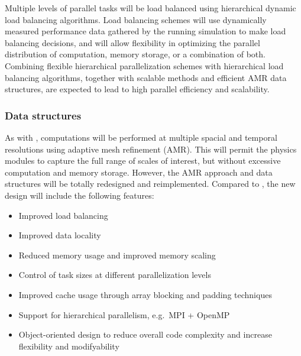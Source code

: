 \documentclass[11pt]{article}
\begin{document}

    Multiple levels of parallel tasks will be load balanced using
    hierarchical dynamic load balancing algorithms.  Load balancing
    schemes will use dynamically measured performance data gathered by
    the running simulation to make load balancing decisions, and will
    allow flexibility in optimizing the parallel distribution of
    computation, memory storage, or a combination of both.  Combining
    flexible hierarchical parallelization schemes with hierarchical
    load balancing algorithms, together with scalable methods and
    efficient AMR data structures, are expected to lead to high
    parallel efficiency and scalability.


    \subsubsection{Data structures}

    
    As with \enzo, computations will be performed at multiple spacial
    and temporal resolutions using adaptive mesh refinement (AMR).
    This will permit the physics modules to capture the full range of
    scales of interest, but without excessive computation and memory
    storage.  However, the AMR approach and data structures will be
    totally redesigned and reimplemented.  Compared to \enzo, the new
    design will include the following features:

    \begin{itemize}
    \item Improved load balancing
    \item Improved data locality
    \item Reduced memory usage and improved memory scaling
    \item Control of task sizes at different parallelization levels
    \item Improved cache usage through array blocking and padding techniques
    \item Support for hierarchical parallelism, e.g.~MPI + OpenMP
    \item Object-oriented design to reduce overall code complexity and 
          increase flexibility and modifyability
    \end{itemize}

\end{document}
